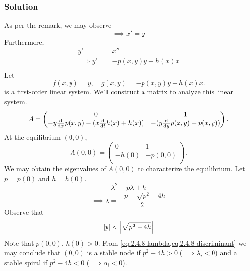 \documentclass[12pt,twoside]{article}
\begin{document}
\subsubsection*{Solution}
As per the remark, we may observe
\begin{equation*}
  \implies x'=y
\end{equation*}
Furthermore,
\begin{equation*}
  \begin{aligned}
    y' &= x'' \\
    \implies y' &= -p(x,y)y - h(x)x \\
  \end{aligned}
\end{equation*}
Let
\begin{equation}
  \label{eq:2.5.8-let}
  f(x,y) = y,\quad g(x,y) = -p(x,y)y - h(x)x.
\end{equation}
 is a first-order linear system. We'll construct a matrix to
analyze this linear system.
\begin{equation*}
  A =
  \begin{pmatrix}
    0 & 1 \\ -y\frac{\mathrm{d}^{} {}}{\mathrm{d}{x}^{}}p(x,y)-(x\frac{\mathrm{d}^{} {}}{\mathrm{d}{t}^{}}h(x)+h(x)) & -(y\frac{\mathrm{d}^{} {}}{\mathrm{d}{y}^{}}p(x,y)+p(x,y)) \\
  \end{pmatrix}.
\end{equation*}
At the equilibrium $(0,0)$,
\begin{equation*}
  A(0,0) =
  \begin{pmatrix}
    0 & 1 \\ -h(0) & -p(0,0) \\
  \end{pmatrix}.
\end{equation*}
We may obtain the eigenvalues of $A(0,0)$ to characterize the equilibrium. Let
$p=p(0)$ and $h=h(0)$.
$$\lambda^2 + p\lambda + h$$
\begin{equation}
  \label{eq:2.4.8-lambda}
  \implies \lambda = \frac{-p\pm\sqrt{p^2-4h}}{2}
\end{equation}
Observe that
\begin{equation}
  \label{eq:2.4.8-discriminant}
  \left|{p}\right| < \left|{\sqrt{p^2-4h}}\right|
\end{equation}
Note that $p(0,0)$, $h(0)>0$. From \cref{eq:2.4.8-lambda,eq:2.4.8-discriminant}
we may conclude that $(0,0)$ is a stable node if $p^2-4h>0$ ($\implies
\lambda_i<0$) and a stable spiral if $p^2-4h<0$ ($\implies\alpha_i<0$).
\end{document}

